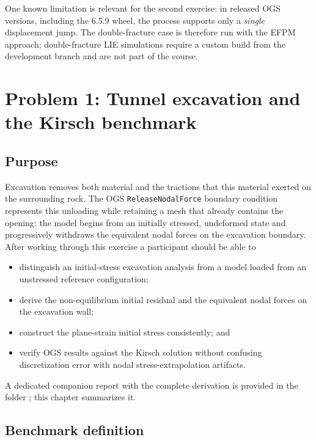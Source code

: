 \documentclass[11pt,a4paper]{tubaf-report}
\begin{document}
{\sloppy
One known limitation is relevant for the second exercise: in released OGS
versions, including the 6.5.9 wheel, the process
 supports only a \emph{single}
displacement jump. The
double-fracture case is therefore run with the EFPM approach; double-fracture
LIE simulations require a custom build from the development branch
 and are not part of the course.\par}

\chapter{Problem 1: Tunnel excavation and the Kirsch benchmark}
\label{ch:kirsch}

\section{Purpose}

Excavation removes both material and the tractions that this material exerted
on the surrounding rock. The OGS \texttt{ReleaseNodalForce} boundary condition
represents this unloading while retaining a mesh that already contains the
opening: the model begins from an initially stressed, undeformed state and
progressively withdraws the equivalent nodal forces on the excavation
boundary. After working through this exercise a participant should be able to
\begin{itemize}[nosep]
  \item distinguish an initial-stress excavation analysis from a model loaded
        from an unstressed reference configuration;
  \item derive the non-equilibrium initial residual and the equivalent nodal
        forces on the excavation wall;
  \item construct the plane-strain initial stress consistently; and
  \item verify OGS results against the Kirsch solution without confusing
        discretization error with nodal stress-extrapolation artifacts.
\end{itemize}
A dedicated companion report with the complete derivation is provided in the
folder ; this chapter
summarizes it.

\section{Benchmark definition}
\end{document}
